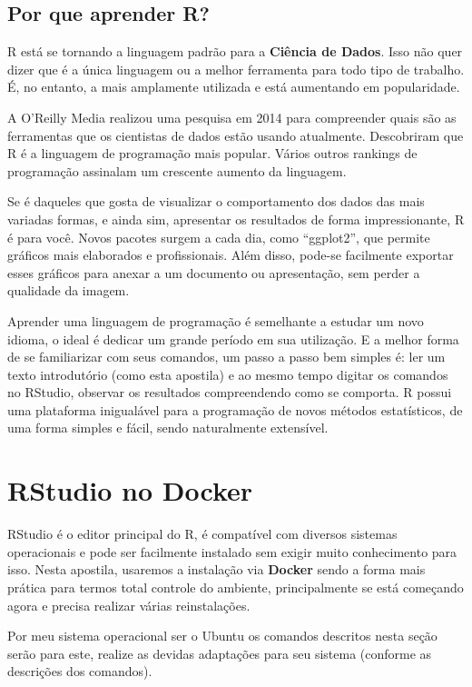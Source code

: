 \documentclass[a4paper,11pt]{article}
\begin{document}
\subsection{Por que aprender R?}
R está se tornando a linguagem padrão para a \textbf{Ciência de Dados}. Isso não quer dizer que é a única linguagem ou a melhor ferramenta para todo tipo de trabalho. É, no entanto, a mais amplamente utilizada e está aumentando em popularidade.

A O’Reilly Media realizou uma pesquisa em 2014 para compreender quais são as ferramentas que os cientistas de dados estão usando atualmente. Descobriram que R é a linguagem de programação mais popular. Vários outros rankings de programação assinalam um crescente aumento da linguagem.

Se é daqueles que gosta de visualizar o comportamento dos dados das mais variadas formas, e ainda sim, apresentar os resultados de forma impressionante, R é para você. Novos pacotes surgem a cada dia, como ``ggplot2'', que permite gráficos mais elaborados e profissionais. Além disso, pode-se facilmente exportar esses gráficos para anexar a um documento ou apresentação, sem perder a qualidade da imagem.

Aprender uma linguagem de programação é semelhante a estudar um novo idioma, o ideal é dedicar um grande período em sua utilização. E a melhor forma de se familiarizar com seus comandos, um passo a passo bem simples é: ler um texto introdutório (como esta apostila) e ao mesmo tempo digitar os comandos no RStudio, observar os resultados compreendendo como se comporta. R possui uma plataforma inigualável para a programação de novos métodos estatísticos, de uma forma simples e fácil, sendo naturalmente extensível. 

\section{RStudio no Docker}
RStudio é o editor principal do R, é compatível com diversos sistemas operacionais e pode ser facilmente instalado sem exigir muito conhecimento para isso. Nesta apostila, usaremos a instalação via \textbf{Docker} sendo a forma mais prática para termos total controle do ambiente, principalmente se está começando agora e precisa realizar várias reinstalações.

\begin{theo}[]{}
Por meu sistema operacional ser o Ubuntu os comandos descritos nesta seção serão para este, realize as devidas adaptações para seu sistema (conforme as descrições dos comandos).
\end{theo}
\end{document}

